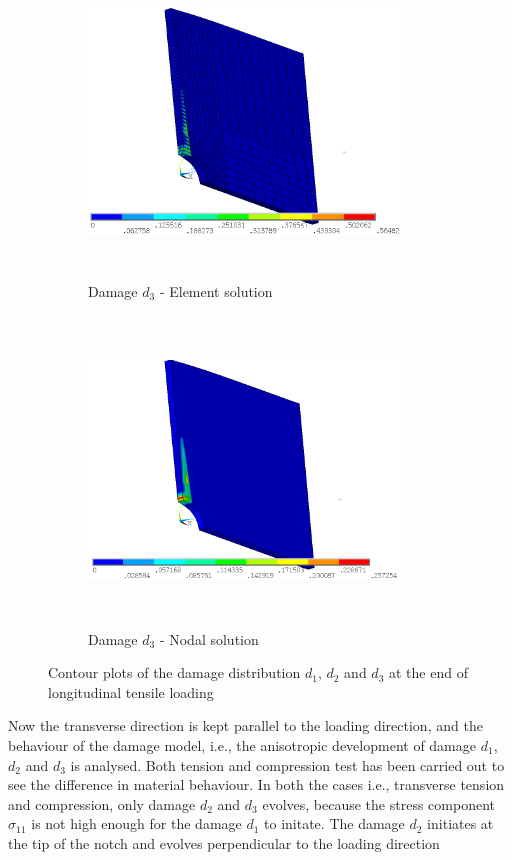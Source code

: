 \documentclass[a4paper,12pt,twoside]{report}
\begin{document}
\begin{figure}[htbp!]\ContinuedFloat     
     \begin{subfigure}[b]{0.4\textwidth}
         \includegraphics[width=8.3cm,height=8.2cm,keepaspectratio]{27.d3-lt-e.png}
         \caption{Damage $d_{3}$ - Element solution}
         \label{fig:d3-lt-e}
     \end{subfigure}
     \hspace{1.8cm}
     \begin{subfigure}[b]{0.4\textwidth}
         \includegraphics[width=8.3cm,height=8.2cm,keepaspectratio]{27.d3-lt-n.png}
         \caption{Damage $d_{3}$ - Nodal solution}
         \label{fig:d3-lt-n}
     \end{subfigure}
        \caption{Contour plots of the damage distribution $d_{1}$, $d_{2}$ and $d_{3}$ at the end of longitudinal tensile loading }
        \label{fig:Contour plots of the damage d1,d2,d3}     
\end{figure}
\FloatBarrier
Now the transverse direction is kept parallel to the loading direction, and the behaviour of the damage model, i.e., the anisotropic development of damage  $d_{1}$, $d_{2}$ and $d_{3}$ is analysed. Both tension and compression test has been carried out to see the difference in material behaviour. In both the cases i.e., transverse tension and compression, only damage $d_{2}$ and $d_{3}$ evolves, because the stress component $\sigma_{11}$ is not high enough for the damage $d_{1}$ to initate. The damage $d_{2}$ initiates at the tip of the notch and evolves perpendicular to the loading direction 
\end{document}
